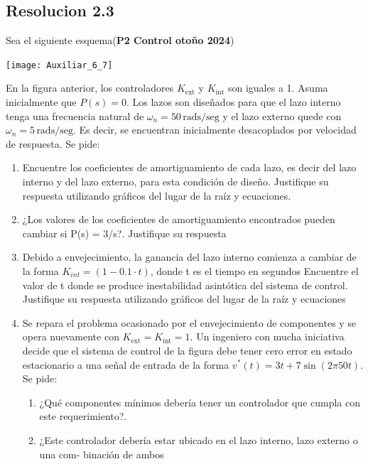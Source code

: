 \documentclass[
  11pt,
  letterpaper,
   addpoints,
   answers
  ]{exam}
\begin{document}
\begin{questions}
\begin{solution}
\subsection*{Resolucion 2.3}

\end{solution}
\question Sea el siguiente esquema(\textbf{P2 Control otoño 2024})

\begin{center}
    \texttt{[image: Auxiliar\_6\_7]}
\end{center}
En la figura anterior, los controladores \(K_{\text{ext}}\) y \(K_{\text{int}}\) son iguales a 1. Asuma inicialmente que \(P(s) = 0\). Los lazos son diseñados para que el lazo interno tenga una frecuencia natural de \(\omega_n = 50 \, \text{rads/seg}\) y el lazo externo quede con \(\omega_n = 5 \, \text{rads/seg}\). Es decir, se encuentran inicialmente desacoplados por velocidad de respuesta. Se pide:

\begin{enumerate}
    \item Encuentre los coeficientes de amortiguamiento de cada lazo, es decir del lazo interno y del lazo externo, para esta condición de diseño. Justifique su respuesta utilizando gráficos del lugar de la raíz y ecuaciones.
    \item ¿Los valores de los coeficientes de amortiguamiento encontrados pueden cambiar si P(s) = 3/s?. Justifique su respuesta
    \item Debido a envejecimiento, la ganancia del lazo interno comienza a cambiar de la forma $K_{int} = (1 - 0.1\cdot t)$, donde t es el tiempo en segundos Encuentre el valor de t donde se produce inestabilidad asintótica del sistema de control. Justifique su respuesta utilizando gráficos del lugar de la raíz y ecuaciones
    \item Se repara el problema ocasionado por el envejecimiento de componentes y se opera nuevamente con \(K_{\text{ext}} = K_{\text{int}} = 1\). Un ingeniero con mucha iniciativa decide que el sistema de control de la figura debe tener cero error en estado estacionario a una señal de entrada de la forma \( v^*(t) = 3t + 7\sin(2\pi 50t) \). Se pide:
    \begin{enumerate}
        \item ¿Qué componentes mínimos debería tener un controlador que cumpla con este requerimiento?.
        \item ¿Este controlador debería estar ubicado en el lazo interno, lazo externo o una com-
        binación de ambos
    \end{enumerate}


\end{enumerate}
\end{questions}
\end{document}
